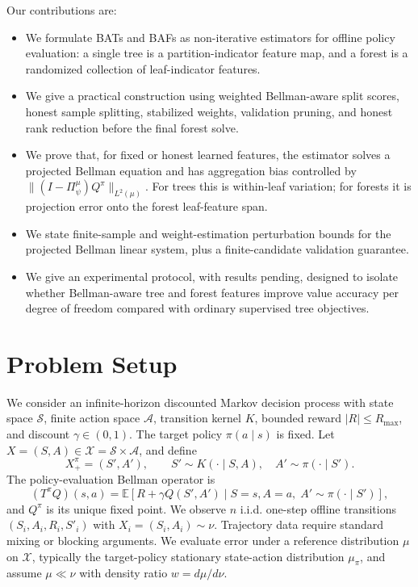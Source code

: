 \documentclass{article}
\newcommand{\E}{\mathbb{E}}
\newcommand{\cS}{\mathcal S}
\newcommand{\cA}{\mathcal A}
\newcommand{\cX}{\mathcal X}
\newcommand{\proj}{\Pi}
\theoremstyle{plain}
\theoremstyle{definition}
\theoremstyle{remark}
\begin{document}
Our contributions are:
\begin{itemize}[leftmargin=1.5em]
\item We formulate BATs and BAFs as non-iterative estimators for offline
policy evaluation: a single tree is a partition-indicator feature map, and a
forest is a randomized collection of leaf-indicator features.
\item We give a practical construction using weighted Bellman-aware split
scores, honest sample splitting, stabilized weights, validation pruning, and
honest rank reduction before the final forest solve.
\item We prove that, for fixed or honest learned features, the estimator solves
a projected Bellman equation and has aggregation bias controlled by
\(\|(I-\proj^\mu_\psi)Q^\pi\|_{L^2(\mu)}\). For trees this is within-leaf
variation; for forests it is projection error onto the forest leaf-feature
span.
\item We state finite-sample and weight-estimation perturbation bounds for the
projected Bellman linear system, plus a finite-candidate validation guarantee.
\item We give an experimental protocol, with results pending, designed to
isolate whether Bellman-aware tree and forest features improve value accuracy
per degree of freedom compared with ordinary supervised tree objectives.
\end{itemize}

\section{Problem Setup}
\label{sec:setup}

We consider an infinite-horizon discounted Markov decision process with state
space \(\cS\), finite action space \(\cA\), transition kernel \(K\), bounded
reward \(|R|\le R_{\max}\), and discount \(\gamma\in(0,1)\). The target policy
\(\pi(a\mid s)\) is fixed. Let \(X=(S,A)\in\cX=\cS\times\cA\), and define
\[
  X^\pi_+ = (S',A'),\qquad
  S'\sim K(\cdot\mid S,A),\quad A'\sim \pi(\cdot\mid S').
\]
The policy-evaluation Bellman operator is
\[
  (T^\pi Q)(s,a)
  =
  \E\!\left[R+\gamma Q(S',A')\mid S=s,A=a,\; A'\sim\pi(\cdot\mid S')\right],
\]
and \(Q^\pi\) is its unique fixed point. We observe \(n\) i.i.d. one-step
offline transitions \((S_i,A_i,R_i,S'_i)\) with
\(X_i=(S_i,A_i)\sim\nu\). Trajectory data require standard mixing or blocking
arguments. We evaluate error under a reference distribution \(\mu\) on
\(\cX\), typically the target-policy stationary state-action distribution
\(\mu_\pi\), and assume \(\mu\ll\nu\) with density ratio \(w=d\mu/d\nu\).
\end{document}
